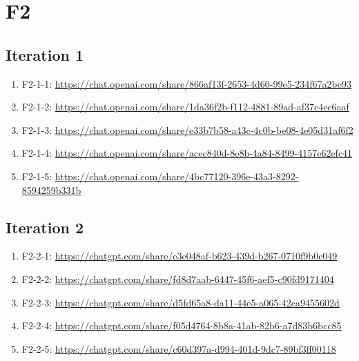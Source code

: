 \section{F2\label{F2-1}}

\subsection{Iteration 1}

\begin{enumerate}
    \item F2-1-1: \href{https://chat.openai.com/share/866af13f-2653-4d60-99e5-234f67a2be93}{https://chat.openai.com/share/866af13f-2653-4d60-99e5-234f67a2be93}
    \item F2-1-2: \href{https://chat.openai.com/share/1da36f2b-f112-4881-89ad-af37c4ee6aaf}{https://chat.openai.com/share/1da36f2b-f112-4881-89ad-af37c4ee6aaf}
    \item F2-1-3: \href{https://chat.openai.com/share/e33b7b58-a43c-4c0b-be08-4e05d31af6f2}{https://chat.openai.com/share/e33b7b58-a43c-4c0b-be08-4e05d31af6f2}
    \item F2-1-4: \href{https://chat.openai.com/share/acec840d-8e8b-4a84-8499-4157e62efc41}{https://chat.openai.com/share/acec840d-8e8b-4a84-8499-4157e62efc41}
    \item F2-1-5: \href{https://chat.openai.com/share/4bc77120-396e-43a3-8292-8594259b331b}{https://chat.openai.com/share/4bc77120-396e-43a3-8292-8594259b331b}
\end{enumerate}

\subsection{Iteration 2}

\begin{enumerate}
    \item F2-2-1: \href{https://chatgpt.com/share/e3e048af-b623-439d-b267-0710f9b0c049}{https://chatgpt.com/share/e3e048af-b623-439d-b267-0710f9b0c049}
    \item F2-2-2: \href{https://chatgpt.com/share/fd8d7aab-6447-45f6-aef5-c90fd9171404}{https://chatgpt.com/share/fd8d7aab-6447-45f6-aef5-c90fd9171404}
    \item F2-2-3: \href{https://chatgpt.com/share/d5fd65a8-da11-44e5-a065-42ca9455602d}{https://chatgpt.com/share/d5fd65a8-da11-44e5-a065-42ca9455602d}
    \item F2-2-4: \href{https://chatgpt.com/share/f05d4764-8b8a-41ab-82b6-a7d83b6bcc85}{https://chatgpt.com/share/f05d4764-8b8a-41ab-82b6-a7d83b6bcc85}
    \item F2-2-5: \href{https://chatgpt.com/share/c60d397a-d994-401d-9dc7-89bf3ff00118}{https://chatgpt.com/share/c60d397a-d994-401d-9dc7-89bf3ff00118}
\end{enumerate}

